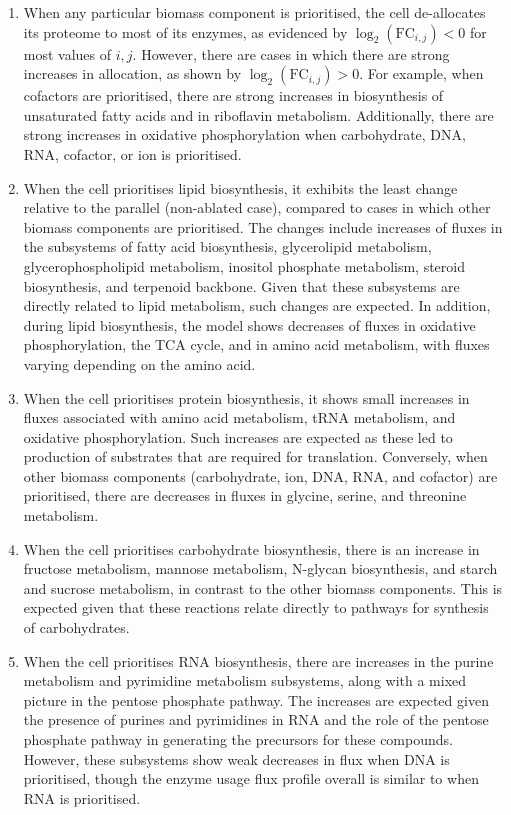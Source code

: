 \begin{enumerate}
  \item When any particular biomass component is prioritised, the cell de-allocates its proteome to most of its enzymes, as evidenced by $\log_{2}(\mathrm{FC}_{i,j}) < 0$ for most values of $i, j$.
        However, there are cases in which there are strong increases in allocation, as shown by $\log_{2}(\mathrm{FC}_{i,j}) > 0$.
        For example, when cofactors are prioritised, there are strong increases in biosynthesis of unsaturated fatty acids and in riboflavin metabolism.
        Additionally, there are strong increases in oxidative phosphorylation when carbohydrate, DNA, RNA, cofactor, or ion is prioritised.
  \item When the cell prioritises lipid biosynthesis, it exhibits the least change relative to the parallel (non-ablated case), compared to cases in which other biomass components are prioritised.
        The changes include increases of fluxes in the subsystems of fatty acid biosynthesis, glycerolipid metabolism, glycerophospholipid metabolism, inositol phosphate metabolism, steroid biosynthesis, and terpenoid backbone.
        Given that these subsystems are directly related to lipid metabolism, such changes are expected.
        In addition, during lipid biosynthesis, the model shows decreases of fluxes in oxidative phosphorylation, the TCA cycle, and in amino acid metabolism, with fluxes varying depending on the amino acid.
  \item When the cell prioritises protein biosynthesis, it shows small increases in fluxes associated with amino acid metabolism, tRNA metabolism, and oxidative phosphorylation.
        Such increases are expected as these led to production of substrates that are required for translation.
        Conversely, when other biomass components (carbohydrate, ion, DNA, RNA, and cofactor) are prioritised, there are decreases in fluxes in glycine, serine, and threonine metabolism.
  \item When the cell prioritises carbohydrate biosynthesis, there is an increase in fructose metabolism, mannose metabolism, N-glycan biosynthesis, and starch and sucrose metabolism, in contrast to the other biomass components.
        This is expected given that these reactions relate directly to pathways for synthesis of carbohydrates.
  \item When the cell prioritises RNA biosynthesis, there are increases in the purine metabolism and pyrimidine metabolism subsystems, along with a mixed picture in the pentose phosphate pathway.
        The increases are expected given the presence of purines and pyrimidines in RNA and the role of the pentose phosphate pathway in generating the precursors for these compounds.
        However, these subsystems show weak decreases in flux when DNA is prioritised, though the enzyme usage flux profile overall is similar to when RNA is prioritised.
\end{enumerate}


